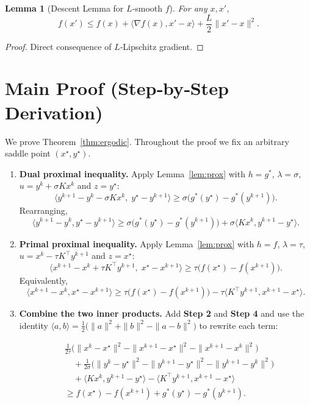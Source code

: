 \documentclass{article}
\newtheorem{lemma}{Lemma}
\begin{document}
\begin{lemma}[Descent Lemma for $L$‑smooth $f$]\label{lem:descent}
For any $x,x'$,
\[
f(x')\le f(x)+\langle \nabla f(x),x'-x\rangle+\frac{L}{2}\|x'-x\|^{2}.
\tag{10}
\]
\end{lemma}
\begin{proof}
Direct consequence of $L$‑Lipschitz gradient.
\end{proof}

\section*{Main Proof (Step‑by‑Step Derivation)}
We prove Theorem~\ref{thm:ergodic}. Throughout the proof we fix an arbitrary saddle point $(x^{\star},y^{\star})$.

\begin{enumerate}
\item \textbf{Dual proximal inequality.}  
Apply Lemma~\ref{lem:prox} with $h=g^{*}$, $\lambda=\sigma$, $u=y^{k}+ \sigma Kx^{k}$ and $z=y^{\star}$:
\[
\langle y^{k+1}-y^{k}-\sigma Kx^{k},\; y^{\star}-y^{k+1}\rangle
\ge \sigma\bigl(g^{*}(y^{\star})-g^{*}(y^{k+1})\bigr).
\tag{Step 1}
\]
Rearranging,
\[
\langle y^{k+1}-y^{k},y^{\star}-y^{k+1}\rangle
\ge \sigma\bigl(g^{*}(y^{\star})-g^{*}(y^{k+1})\bigr)
+\sigma\langle Kx^{k},y^{k+1}-y^{\star}\rangle .
\tag{Step 2}
\]

\item \textbf{Primal proximal inequality.}  
Apply Lemma~\ref{lem:prox} with $h=f$, $\lambda=\tau$, $u=x^{k}-\tau K^{\!\top}y^{k+1}$ and $z=x^{\star}$:
\[
\langle x^{k+1}-x^{k}+\tau K^{\!\top}y^{k+1},\; x^{\star}-x^{k+1}\rangle
\ge \tau\bigl(f(x^{\star})-f(x^{k+1})\bigr).
\tag{Step 3}
\]
Equivalently,
\[
\langle x^{k+1}-x^{k},x^{\star}-x^{k+1}\rangle
\ge \tau\bigl(f(x^{\star})-f(x^{k+1})\bigr)
-\tau\langle K^{\!\top}y^{k+1},x^{k+1}-x^{\star}\rangle .
\tag{Step 4}
\]

\item \textbf{Combine the two inner products.}  
Add \textbf{Step 2} and \textbf{Step 4} and use the identity  
$\langle a,b\rangle =\frac12\bigl(\|a\|^{2}+\|b\|^{2}-\|a-b\|^{2}\bigr)$ to rewrite each term:

\[
\begin{aligned}
&\frac{1}{2\tau}\bigl(\|x^{k}-x^{\star}\|^{2}-\|x^{k+1}-x^{\star}\|^{2}
-\|x^{k+1}-x^{k}\|^{2}\bigr)\\
&\quad+\frac{1}{2\sigma}\bigl(\|y^{k}-y^{\star}\|^{2}-\|y^{k+1}-y^{\star}\|^{2}
-\|y^{k+1}-y^{k}\|^{2}\bigr)\\
&\quad+\langle Kx^{k},y^{k+1}-y^{\star}\rangle
-\langle K^{\!\top}y^{k+1},x^{k+1}-x^{\star}\rangle
\\
&\ge f(x^{\star})-f(x^{k+1})+g^{*}(y^{\star})-g^{*}(y^{k+1}).
\end{aligned}
\tag{Step 5}
\]


\end{enumerate}
\end{document}
